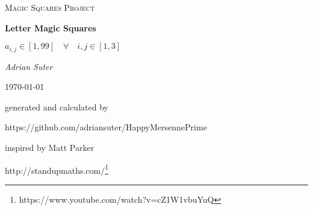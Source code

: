 \documentclass{article}
\begin{document}
\begin{titlepage}
\centering
{\scshape\LARGE Magic Squares Project\par}
\vspace{1.5cm}
{\huge\bfseries Letter Magic Squares\par}
\vspace{1.5cm}
{\huge $a_{i,j} \in [1, 99] \hspace{1em} \forall \hspace{1em} i,j \in [1,3]$\par
}\vspace{2cm}
{\Large\itshape Adrian Suter\par}
\vspace{1cm}
{\large \today\par}
\vspace{2cm}
generated and calculated by\par
https://github.com/adriansuter/HappyMersennePrime\par
\vspace{1cm}
inspired by Matt Parker\par
http://standupmaths.com/\footnote{https://www.youtube.com/watch?v=cZ1W1vbuYuQ}\par
\end{titlepage}
\end{document}
